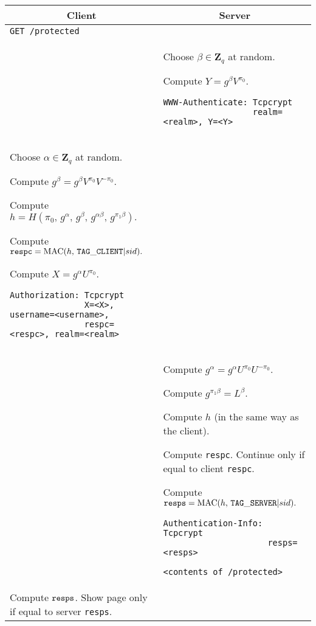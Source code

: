 \documentclass[10pt]{article}
\begin{document}
\begin{tabular}{p{9cm} | p{9cm}}
\multicolumn{1}{c}{\bf Client} & \multicolumn{1}{c}{\bf Server} \\
\hline
{\tt GET /protected} &\\

& Choose $\beta \in \mathbf{Z}_q$ at random.

Compute $Y=g^\beta V^{\pi_0}.$

\begin{verbatim}
WWW-Authenticate: Tcpcrypt 
                  realm=<realm>, Y=<Y>
\end{verbatim} \\

Choose $\alpha \in \mathbf{Z}_q$ at random.

Compute $g^\beta = g^\beta V^{\pi_0} V^{-\pi_0}.$

Compute $h = H(\pi_0,\, g^\alpha,\, g^\beta,\, g^{\alpha \beta},\, g^{\pi_1 \beta}).$

Compute ${\tt respc} = \operatorname{MAC}(h,\, {\tt TAG\_CLIENT} | sid).$

Compute $X=g^\alpha U^{\pi_0}.$

\begin{verbatim}
Authorization: Tcpcrypt 
               X=<X>, username=<username>,
               respc=<respc>, realm=<realm>
\end{verbatim}

& \\

& Compute $g^\alpha = g^\alpha U^{\pi_0} U^{-\pi_0}.$

Compute $g^{\pi_1 \beta} = L^\beta.$

Compute $h$ (in the same way as the client).

Compute {\tt respc}. Continue only if equal to client {\tt respc}.

Compute ${\tt resps} = \operatorname{MAC}(h,\, {\tt TAG\_SERVER} | sid).$
\begin{verbatim}
Authentication-Info: Tcpcrypt 
                     resps=<resps>

<contents of /protected>
\end{verbatim} \\

Compute ${\tt resps}$. Show page only if equal to server {\tt resps}.
\end{tabular}
\end{document}
